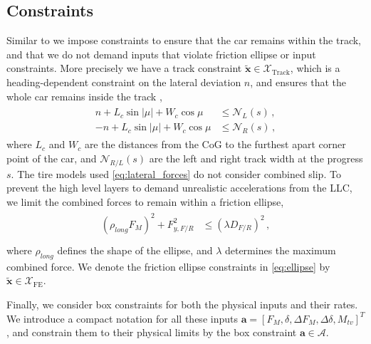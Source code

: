 \subsection{Constraints}
\label{sec:constraints}
Similar to \cite{vazquez2020optimization} we impose constraints to ensure that the car remains within the track, and that we do not demand inputs that violate friction ellipse or input constraints. More precisely we have a track constraint $\mathbf{\tilde{x}} \in \mathcal{X}_{\text{Track}}$, which is a heading-dependent constraint on the lateral deviation $n$, and ensures that the whole car remains inside the track \cite{liniger2020safe}, 
\begin{align}
\label{eq:boundary}
\begin{split}
    n + L_c\sin{|\mu|} + W_c\cos{\mu} & \leq \mathcal{N}_L(s) \,,\\
    -n + L_c\sin{|\mu|} + W_c\cos{\mu} & \leq \mathcal{N}_R(s)\,,
\end{split}
\end{align}
where $L_{c}$ and $W_c$ are the distances from the CoG to the furthest apart corner point of the car, and $\mathcal{N}_{R/L}(s)$ are the left and right track width at the progress $s$. The tire models used \eqref{eq:lateral_forces} do not consider combined slip. To prevent the high level layers to demand unrealistic accelerations from the LLC, we limit the combined forces to remain within a friction ellipse, 
\begin{align}
\label{eq:ellipse}
\begin{split}
(\rho_{long}F_M)^2 + F_{y,F/R}^2 & \leq (\lambda D_{F/R})^2\,, \\
\end{split}
\end{align}
where $\rho_{long}$ defines the shape of the ellipse, and $\lambda$ determines the maximum combined force. We denote the friction ellipse constraints in \eqref{eq:ellipse} by $\mathbf{\tilde{x}} \in \mathcal{X}_\text{FE}$.

Finally, we consider box constraints for both the physical inputs and their rates. We introduce a compact notation for all these inputs $\mathbf{a} = [F_M, \delta, \Delta F_M, \Delta \delta, M_{tv}]^T$, and constrain them to their physical limits by the box constraint $\mathbf{a} \in \mathcal{A}$.
